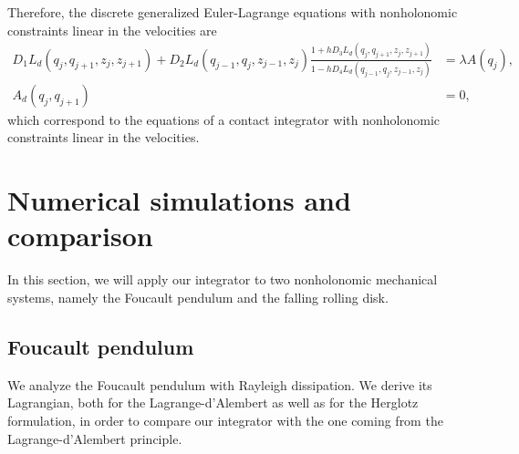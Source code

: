 \documentclass{aims}
\numberwithin{equation}{section}
\theoremstyle{definition}
\begin{document}
Therefore, the discrete generalized Euler-Lagrange equations with nonholonomic constraints linear in the velocities are
\small
\begin{equation}\label{constrained-discrete-GEL-eq}
\begin{split}
  D_1 L_d(q_j, q_{j+1}, z_j, z_{j+1}) + D_2 L_d(q_{j-1}, q_j, z_{j-1}, z_j) \frac{1 + h D_3 L_d(q_j, q_{j+1}, z_j, z_{j+1})}{1 - h D_4 L_d(q_{j-1}, q_j, z_{j-1}, z_j)} &= \lambda A(q_j), \\
  A_d(q_j, q_{j+1}) &= 0,
\end{split}
\end{equation}
\normalsize
which correspond to the equations of a contact integrator with nonholonomic constraints linear in the velocities.

\section{Numerical simulations and comparison}\label{sec:Numerical-experiments}
In this section, we will apply our integrator to two nonholonomic mechanical systems, namely the Foucault pendulum and the falling rolling disk.  


\subsection{Foucault pendulum}
We analyze the Foucault pendulum with Rayleigh dissipation. We derive its Lagrangian, both for the Lagrange-d'Alembert as well as for the Herglotz formulation, in order to compare our integrator with the one coming from the Lagrange-d'Alembert principle.
\end{document}
